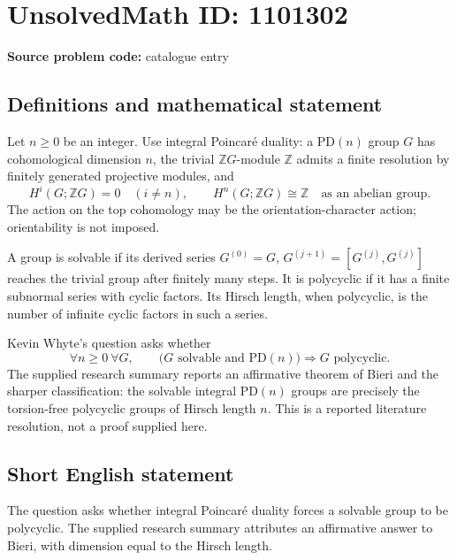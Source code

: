 \documentclass[11pt]{article}
\newcommand{\Z}{\mathbb{Z}}
\begin{document}
\section*{UnsolvedMath ID: 1101302}
\textbf{Source problem code:} catalogue entry
\subsection{Definitions and mathematical statement}
Let $n\geq0$ be an integer. Use integral Poincar\'e duality: a PD$(n)$ group $G$ has cohomological dimension $n$, the trivial $\Z G$-module $\Z$ admits a finite resolution by finitely generated projective modules, and
\[
H^i(G;\Z G)=0\quad(i\ne n),\qquad
H^n(G;\Z G)\cong\Z\quad\text{as an abelian group}.
\]
The action on the top cohomology may be the orientation-character action; orientability is not imposed.

A group is solvable if its derived series $G^{(0)}=G$, $G^{(j+1)}=[G^{(j)},G^{(j)}]$ reaches the trivial group after finitely many steps. It is polycyclic if it has a finite subnormal series with cyclic factors. Its Hirsch length, when polycyclic, is the number of infinite cyclic factors in such a series.

Kevin Whyte's question asks whether
\[
\forall n\geq0\ \forall G,\qquad
\bigl(G\text{ solvable and PD}(n)\bigr)
\Longrightarrow G\text{ polycyclic}.
\]
The supplied research summary reports an affirmative theorem of Bieri and the sharper classification: the solvable integral PD$(n)$ groups are precisely the torsion-free polycyclic groups of Hirsch length $n$. This is a reported literature resolution, not a proof supplied here.
\subsection{Short English statement}
The question asks whether integral Poincar\'e duality forces a solvable group to be polycyclic. The supplied research summary attributes an affirmative answer to Bieri, with dimension equal to the Hirsch length.
\end{document}
